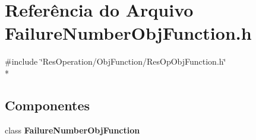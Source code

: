 \section{Referência do Arquivo Failure\+Number\+Obj\+Function.\+h}
\label{_obj_function_2_failure_number_2_failure_number_obj_function_8h}
{\ttfamily \#include \char`\"{}Res\+Operation/\+Obj\+Function/\+Res\+Op\+Obj\+Function.\+h\char`\"{}}\\*
\subsection*{Componentes}
\begin{DoxyCompactItemize}
\item 
class {\bf Failure\+Number\+Obj\+Function}
\end{DoxyCompactItemize}
